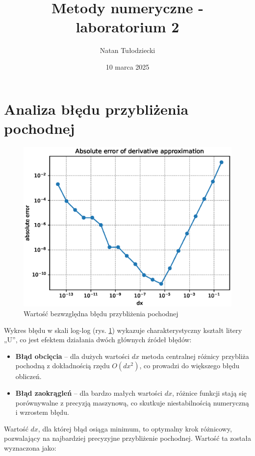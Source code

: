 \documentclass{article}
\title{Metody numeryczne - laboratorium 2}
\author{Natan Tułodziecki}
\date{10 marca 2025}
\begin{document}
\maketitle

\section{Analiza błędu przybliżenia pochodnej}

\begin{figure}[H]
    \centering
    \includegraphics[width=1\linewidth]{Figure_1.eps}
    \caption{Wartość bezwzględna błędu przybliżenia pochodnej}
    \label{fig:blad}
\end{figure}

Wykres błędu w skali log-log (rys. \ref{fig:blad}) wykazuje charakterystyczny kształt litery „U”, co jest efektem działania dwóch głównych źródeł błędów:

\begin{itemize}
    \item \textbf{Błąd obcięcia} – dla dużych wartości \( dx \) metoda centralnej różnicy przybliża pochodną z dokładnością rzędu \( O(dx^2) \), co prowadzi do większego błędu obliczeń.
    \item \textbf{Błąd zaokrągleń} – dla bardzo małych wartości \( dx \), różnice funkcji stają się porównywalne z precyzją maszynową, co skutkuje niestabilnością numeryczną i wzrostem błędu.
\end{itemize}

Wartość \( dx \), dla której błąd osiąga minimum, to optymalny krok różnicowy, pozwalający na najbardziej precyzyjne przybliżenie pochodnej. Wartość ta została wyznaczona jako:
\end{document}
